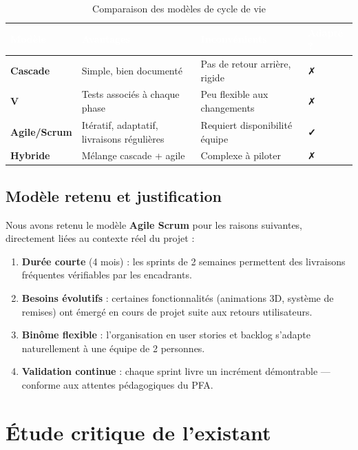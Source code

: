 \documentclass[12pt,a4paper]{report}
\begin{document}
\begin{table}[H]
\centering
\caption{Comparaison des modèles de cycle de vie}
\label{tab:cycle_vie}
\begin{tabularx}{\textwidth}{|l|X|X|l|}
\hline
\rowcolor{emsiblue}\textcolor{white}{\textbf{Modèle}} & \textcolor{white}{\textbf{Avantages}} & \textcolor{white}{\textbf{Inconvénients}} & \textcolor{white}{\textbf{Adapté ?}} \\
\hline
\textbf{Cascade} & Simple, bien documenté & Pas de retour arrière, rigide & ✗ \\
\textbf{V} & Tests associés à chaque phase & Peu flexible aux changements & ✗ \\
\textbf{Agile/Scrum} & Itératif, adaptatif, livraisons régulières & Requiert disponibilité équipe & \textbf{✓} \\
\textbf{Hybride} & Mélange cascade + agile & Complexe à piloter & ✗ \\
\hline
\end{tabularx}
\end{table}

\subsection{Modèle retenu et justification}

Nous avons retenu le modèle \textbf{Agile Scrum} pour les raisons suivantes, directement liées au contexte réel du projet :
\begin{enumerate}
    \item \textbf{Durée courte} (4 mois) : les sprints de 2 semaines permettent des livraisons fréquentes vérifiables par les encadrants.
    \item \textbf{Besoins évolutifs} : certaines fonctionnalités (animations 3D, système de remises) ont émergé en cours de projet suite aux retours utilisateurs.
    \item \textbf{Binôme flexible} : l'organisation en user stories et backlog s'adapte naturellement à une équipe de 2 personnes.
    \item \textbf{Validation continue} : chaque sprint livre un incrément démontrable — conforme aux attentes pédagogiques du PFA.
\end{enumerate}

\section{Étude critique de l'existant}
\end{document}
